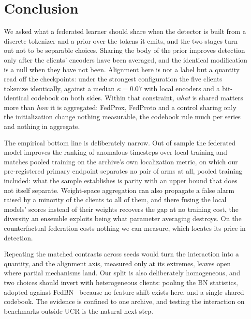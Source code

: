 \documentclass[conference]{IEEEtran}
\begin{document}
\section{Conclusion}
\label{sec:conclusion}

We asked what a federated learner should share when the detector is built from a discrete tokenizer
and a prior over the tokens it emits, and the two stages turn out not to be separable choices.
Sharing the body of the prior improves detection only after the clients' encoders have been
averaged, and the identical modification is a null when they have not been. Alignment here is not a
label but a quantity read off the checkpoints: under the strongest configuration the five clients
tokenize identically, against a median $\kappa=0.07$ with local encoders and a bit-identical
codebook on both sides. Within that constraint, \emph{what} is
shared matters more than \emph{how} it is aggregated: FedProx, FedProto and a control sharing only
the initialization change nothing measurable, the codebook rule much per series and nothing in
aggregate.

The empirical bottom line is deliberately narrow. Out of sample the federated model improves the
ranking of anomalous timesteps over local training and matches pooled training on the archive's own
localization metric, on which our pre-registered primary endpoint separates no pair of arms at all,
pooled training included: what the sample establishes is parity with an upper bound that does not
itself separate. Weight-space aggregation can also propagate a false alarm raised by a minority of
the clients to all of them, and there fusing the local models' scores instead of their weights
recovers the gap at no training cost, the diversity an ensemble exploits being what parameter
averaging destroys. On the counterfactual federation costs nothing we can measure, which locates its
price in detection.

Repeating the matched contrasts across seeds would turn the interaction into a quantity, and the
alignment axis, measured only at its extremes, leaves open where partial mechanisms land. Our split
is also deliberately homogeneous, and two choices should invert with heterogeneous clients: pooling
the BN statistics, adopted against FedBN~\cite{li2021fedbn} because no feature shift exists here,
and a single shared codebook. The evidence is confined to one archive, and testing the interaction
on benchmarks outside UCR is the natural next step.
\end{document}
